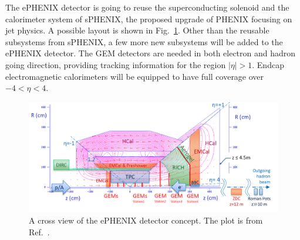 The ePHENIX detector is going to reuse the superconducting solenoid and the
calorimeter system of sPHENIX, the proposed upgrade of PHENIX focusing on jet
physics. A possible layout is shown in Fig.~\ref{fig:ePhenix_layout}.
Other than the reusable subsystems from sPHENIX, a few more new subsystems will
be added to the ePHENIX detector. The GEM detectors are needed in both electron
and hadron going direction, providing tracking information for the region
$|\eta|>1$. Endcap electromagnetic calorimeters will be equipped to have full
coverage over $-4<\eta<4$.
\begin{figure}
\centering
\includegraphics[width=1.0\textwidth]{plots/chpt4/ePhenix_layout.png}
\caption[A layout of the ePHENIX detector concept]{
A cross view of the ePHENIX detector concept. The plot is from Ref.~\cite{Adare:2014aaa}.}
\label{fig:ePhenix_layout}
\end{figure}

